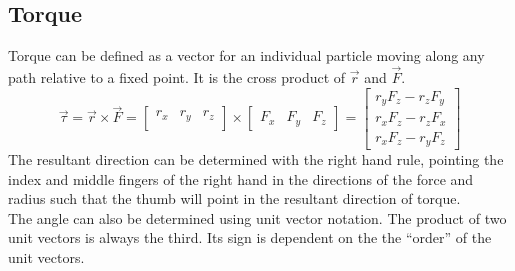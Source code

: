 \documentclass[../AP_Physics_C.tex]{subfiles}
\begin{document}
		\subsection{Torque}
			Torque can be defined as a vector for an individual particle moving along any path relative to a fixed point. It is the cross product of $\vec{r}$ and $\vec{F}$.
			\[
				\vec{\tau} = \vec{r} \times \vec{F} = 
					\begin{bmatrix}
				 		r_x & r_y & r_z \\
					\end{bmatrix} \times 
					\begin{bmatrix}
				 		F_x & F_y & F_z
					\end{bmatrix} =
					\begin{bmatrix}
						r_yF_z - r_zF_y \\
						r_xF_z - r_zF_x \\
						r_xF_z - r_yF_z
					\end{bmatrix}
			\]
			The resultant direction can be determined with the right hand rule, pointing the index and middle fingers of the right hand in the directions of the force and radius such that the thumb will point in the resultant direction of torque. \\
			The angle can also be determined using unit vector notation. The product of two unit vectors is always the third. Its sign is dependent on the the \enquote{order} of the unit vectors.
			\begin{center}
			\end{center}
\end{document}
